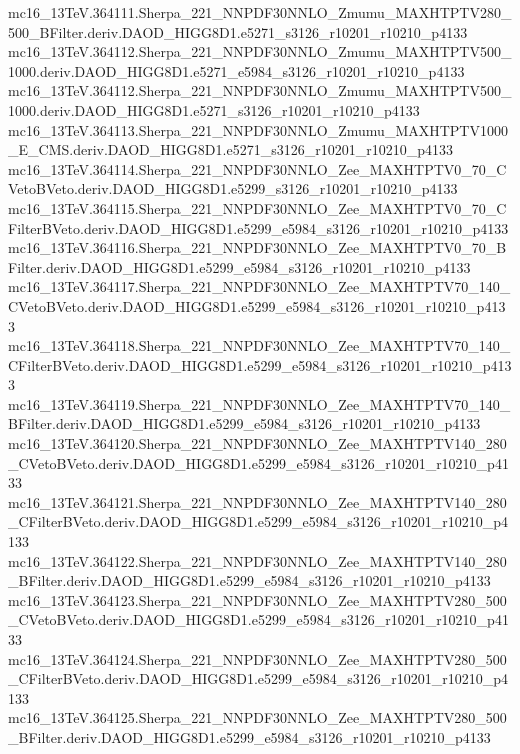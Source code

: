 mc16_13TeV.364111.Sherpa_221_NNPDF30NNLO_Zmumu_MAXHTPTV280_500_BFilter.deriv.DAOD_HIGG8D1.e5271_s3126_r10201_r10210_p4133 \\
mc16_13TeV.364112.Sherpa_221_NNPDF30NNLO_Zmumu_MAXHTPTV500_1000.deriv.DAOD_HIGG8D1.e5271_e5984_s3126_r10201_r10210_p4133 \\
mc16_13TeV.364112.Sherpa_221_NNPDF30NNLO_Zmumu_MAXHTPTV500_1000.deriv.DAOD_HIGG8D1.e5271_s3126_r10201_r10210_p4133 \\
mc16_13TeV.364113.Sherpa_221_NNPDF30NNLO_Zmumu_MAXHTPTV1000_E_CMS.deriv.DAOD_HIGG8D1.e5271_s3126_r10201_r10210_p4133 \\
mc16_13TeV.364114.Sherpa_221_NNPDF30NNLO_Zee_MAXHTPTV0_70_CVetoBVeto.deriv.DAOD_HIGG8D1.e5299_s3126_r10201_r10210_p4133 \\
mc16_13TeV.364115.Sherpa_221_NNPDF30NNLO_Zee_MAXHTPTV0_70_CFilterBVeto.deriv.DAOD_HIGG8D1.e5299_e5984_s3126_r10201_r10210_p4133 \\
mc16_13TeV.364116.Sherpa_221_NNPDF30NNLO_Zee_MAXHTPTV0_70_BFilter.deriv.DAOD_HIGG8D1.e5299_e5984_s3126_r10201_r10210_p4133 \\
mc16_13TeV.364117.Sherpa_221_NNPDF30NNLO_Zee_MAXHTPTV70_140_CVetoBVeto.deriv.DAOD_HIGG8D1.e5299_e5984_s3126_r10201_r10210_p4133 \\
mc16_13TeV.364118.Sherpa_221_NNPDF30NNLO_Zee_MAXHTPTV70_140_CFilterBVeto.deriv.DAOD_HIGG8D1.e5299_e5984_s3126_r10201_r10210_p4133 \\
mc16_13TeV.364119.Sherpa_221_NNPDF30NNLO_Zee_MAXHTPTV70_140_BFilter.deriv.DAOD_HIGG8D1.e5299_e5984_s3126_r10201_r10210_p4133 \\
mc16_13TeV.364120.Sherpa_221_NNPDF30NNLO_Zee_MAXHTPTV140_280_CVetoBVeto.deriv.DAOD_HIGG8D1.e5299_e5984_s3126_r10201_r10210_p4133 \\
mc16_13TeV.364121.Sherpa_221_NNPDF30NNLO_Zee_MAXHTPTV140_280_CFilterBVeto.deriv.DAOD_HIGG8D1.e5299_e5984_s3126_r10201_r10210_p4133 \\
mc16_13TeV.364122.Sherpa_221_NNPDF30NNLO_Zee_MAXHTPTV140_280_BFilter.deriv.DAOD_HIGG8D1.e5299_e5984_s3126_r10201_r10210_p4133 \\
mc16_13TeV.364123.Sherpa_221_NNPDF30NNLO_Zee_MAXHTPTV280_500_CVetoBVeto.deriv.DAOD_HIGG8D1.e5299_e5984_s3126_r10201_r10210_p4133 \\
mc16_13TeV.364124.Sherpa_221_NNPDF30NNLO_Zee_MAXHTPTV280_500_CFilterBVeto.deriv.DAOD_HIGG8D1.e5299_e5984_s3126_r10201_r10210_p4133 \\
mc16_13TeV.364125.Sherpa_221_NNPDF30NNLO_Zee_MAXHTPTV280_500_BFilter.deriv.DAOD_HIGG8D1.e5299_e5984_s3126_r10201_r10210_p4133 \\
